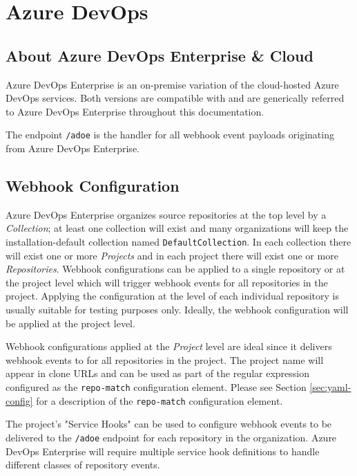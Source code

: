 \chapter{Azure DevOps}


\section{About Azure DevOps Enterprise \& Cloud}

Azure DevOps Enterprise is an on-premise variation of the cloud-hosted Azure DevOps services.
Both versions are compatible with \cxoneflow and are generically referred to Azure DevOps Enterprise
throughout this documentation.

The \cxoneflow endpoint \texttt{/adoe} is the handler for all webhook event
payloads originating from Azure DevOps Enterprise.  

\section{Webhook Configuration}

Azure DevOps Enterprise organizes source repositories at the top level by a \textit{Collection};
at least one collection will exist and many organizations will keep the installation-default
collection named \texttt{DefaultCollection}.  In each collection there will exist one or more
\textit{Projects} and in each project there will exist one or more \textit{Repositories}.  
Webhook configurations can be applied to a single repository or at the project level which
will trigger webhook events for all repositories in the project. Applying the configuration at the
level of each individual repository is usually suitable for testing purposes only. Ideally,
the webhook configuration will be applied at the project level.

Webhook configurations applied at the \textit{Project} level are ideal since it delivers webhook
events to \cxoneflow for all repositories in the project.  The project name will appear in 
clone URLs and can be used as part of the regular expression configured as the \texttt{repo-match}
configuration element.  Please see Section \ref{sec:yaml-config} for a description
of the \texttt{repo-match} configuration element.

The project's "Service Hooks" can be used to configure webhook events to be delivered to the
\cxoneflow \texttt{/adoe} endpoint for each repository in the organization.  Azure DevOps
Enterprise will require multiple service hook definitions to handle different classes
of repository events.

